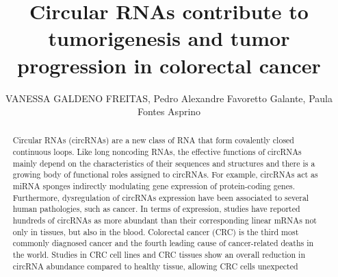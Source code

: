 \documentclass[twoside]{article}
\title{\vspace{-15mm}\fontsize{24pt}{10pt}\selectfont\textbf{ Circular RNAs contribute to tumorigenesis and tumor progression in colorectal cancer }} %
\author{ VANESSA GALDENO FREITAS, Pedro Alexandre Favoretto Galante, Paula Fontes Asprino }
\affil{ Interunidades em Bioinform\'atica - IME USP / Instituto de Ensino e Pesquisa S\'{\i}rio Liban\^es - IEP HSL }
\date{}
\begin{document}
  
  
  \maketitle %
  
  
  \thispagestyle{fancy} %
  
  
  \begin{abstract}
  Circular RNAs (circRNAs) are a new class of RNA that form covalently closed continuous loops. Like long noncoding RNAs,  the effective functions of circRNAs mainly depend on the characteristics of their sequences and structures and there is a growing body of functional roles assigned to circRNAs. For example,  circRNAs act as miRNA sponges indirectly modulating gene expression of protein-coding genes. Furthermore,  dysregulation of circRNAs expression have been associated to several human pathologies,  such as cancer. In terms of expression,  studies have reported hundreds of circRNAs as more abundant than their corresponding linear mRNAs not only in tissues,  but also in the blood. Colorectal cancer (CRC) is the third most commonly diagnosed cancer and the fourth leading cause of cancer-related deaths in the world. Studies in CRC cell lines and CRC tissues show an overall reduction in circRNA abundance compared to healthy tissue,  allowing CRC cells unexpected

\end{abstract}
\end{document}
